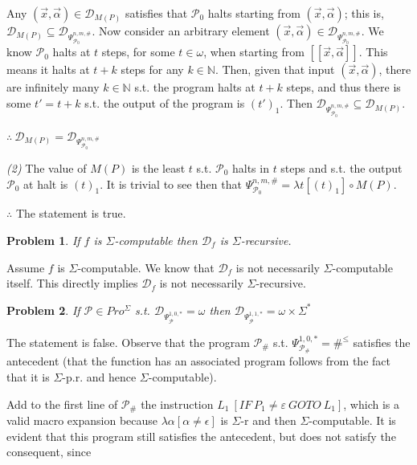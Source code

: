 \documentclass[a4paper, 12pt]{article}
\newtheorem{problem}{Problem}
\newtheorem{problem}{Problem}
\begin{document}
Any $(\vec{x}, \vec{\alpha}) \in \mathcal{D}_{M(P)}$ satisfies that
$\mathcal{P}_0$ halts starting from $(\vec{x}, \vec{\alpha})$; this is,
$\mathcal{D}_{M(P)} \subseteq \mathcal{D}_{\Psi_{\mathcal{P}_0}^{n, m, \#}}$.
Now consider an arbitrary element $(\vec{x}, \vec{\alpha}) \in
\mathcal{D}_{\Psi_{\mathcal{P}_0}^{n, m, \#}}$.  We know $\mathcal{P}_0$ halts
at $t$ steps, for some $t \in \omega$, when starting from $[\![ \vec{x},
\vec{\alpha} ]\!]$. This means it halts at $t + k$ steps for any $k \in
\mathbb{N}$. Then, given that input $(\vec{x}, \vec{\alpha}) $, there are
infinitely many 
$k \in \mathbb{N}$ s.t. the program halts at $t + k$ steps, and thus there is
some $t' = t + k$ s.t. the output of the program is $(t')_1$. Then
$\mathcal{D}_{\Psi_{\mathcal{P}_0}^{n, m, \#}} \subseteq \mathcal{D}_{M(P)}$. 

$\therefore ~ \mathcal{D}_{M(P)} = \mathcal{D}_{\Psi_{\mathcal{P}_0}^{n, m, \#}}$

\textit{(2)} The value of $M(P)$ is the least $t$ s.t. $\mathcal{P}_0$ halts in $t$
steps and s.t. the output $\mathcal{P}_0$ at halt is $(t)_1$. It is trivial to
see then that $\Psi_{\mathcal{P}_0}^{n, m, \#} = \lambda t \left[  (t)_1 \right]
\circ M(P)$.

$\therefore $ The statement is true.

\pagebreak 

\begin{problem}
    If $f$ is $\Sigma$-computable then $\mathcal{D}_f$ is $\Sigma$-recursive.
\end{problem}

Assume $f$ is $\Sigma$-computable. We know that $\mathcal{D}_f$ is not
necessarily $\Sigma$-computable itself. This directly implies $\mathcal{D}_f$ is
not necessarily $\Sigma$-recursive.

\begin{problem}
    If $\mathcal{P} \in Pro^{\Sigma}$ s.t. $\mathcal{D}_{\Psi_{\mathcal{P}}^{1,
    0, *}} = \omega$ then $\mathcal{D}_{\Psi_{\mathcal{P}}^{1, 1, *}} = \omega
    \times \Sigma^{*}$
\end{problem}

The statement is false. Observe that the program $\mathcal{P}_{\#}$  s.t.
$\Psi_{\mathcal{P}_{\#}}^{1, 0, *} = \#^{\leq}$ satisfies the antecedent (that
the function has an associated program follows from the fact that it is
$\Sigma$-p.r. and hence $\Sigma$-computable).


Add to the first line of $\mathcal{P}_{\#}$ the instruction $L_1 ~ [ IF ~ P_1
\neq \varepsilon ~ GOTO ~ L_1]$, which is a valid macro expansion because
$\lambda \alpha \left[ \alpha \neq \epsilon  \right]$ is $\Sigma$-r and then
$\Sigma$-computable. It is evident that this program still satisfies the
antecedent, but does not satisfy the consequent, since 
\end{document}
